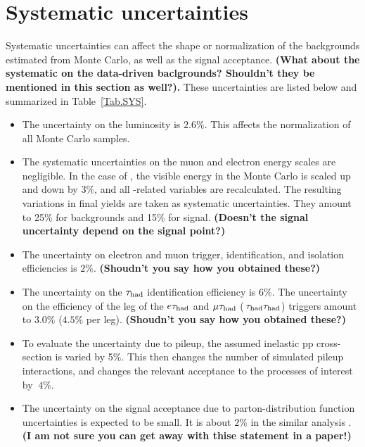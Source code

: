 \section{Systematic uncertainties}
\label{sect:sys}
Systematic uncertainties can affect the shape or normalization of the
backgrounds estimated from Monte Carlo, as well as the signal acceptance.
{\bf (What about the systematic on the data-driven baclgrounds?
  Shouldn't they be mentioned in this section as well?).}
These uncertainties are listed below and summarized in Table~\ref{Tab.SYS}.


\begin{itemize}

\item The uncertainty on the luminosity  is $2.6\%$.  This affects the
  normalization of all Monte Carlo samples.
 
\item  The systematic uncertainties on the muon and electron energy scales
  are negligible.  In the case of \Tau, the visible energy in the Monte Carlo
  is scaled up and down by $3\%$, and all \Tau-related variables are
  recalculated.  The resulting variations in final yields are taken as
  systematic
  uncertainties.  They amount to 25\% for backgrounds and 15\% for signal.
  {\bf (Doesn't the signal uncertainty depend on the signal point?)}

\item The uncertainty on electron and muon trigger, identification, and
  isolation efficiencies is $2\%$.
  {\bf (Shoudn't you say how you obtained these?)}

\item The uncertainty on the $\tau_{\rm had}$ identification efficiency is $6\%$. 
  The uncertainty on the efficiency of the \Tau leg of the $e\tau_{\rm had}$ and
  $\mu\tau_{\rm had}$ ($\,\tau_{\rm had}\tau_{\rm had}$) triggers amount to $3.0\%$ ($4.5\%$ per leg).
  {\bf (Shoudn't you say how you obtained these?)}

\item To evaluate the uncertainty due to pileup, the assumed inelastic
  pp cross-section is varied by 5\%.  This then changes the number
  of simulated pileup interactions, and changes the relevant acceptance
  to the processes of interest by $~4 \%$.

\item The uncertainty on the signal acceptance due to parton-distribution
  function uncertainties is expected to be small.
  It is about $2\%$ in the similar analysis \cite{Khachatryan:2014qwa}.
  {\bf (I am not sure you can get away with thise statement in a paper!)}


\end{itemize}
